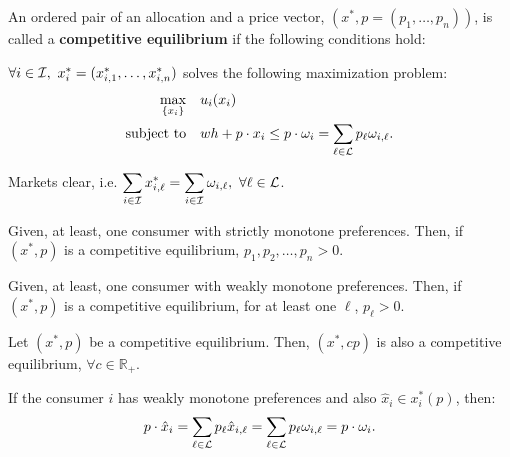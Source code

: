 \documentclass[8pt,a4paper]{extarticle}
\begin{document}
\begin{multicols}{3}
  \begin{boxdef}
    An ordered pair of an allocation and a price vector, $(x^*, p = (p_1, \ldots, p_n))$, is called a \textbf{competitive equilibrium} if the following conditions hold:
    \begin{eqlist}
      \item $\forall i \in \mathcal{I},\ x^*_i = (x^*_{i, 1}, \ldots, x^*_{i, n})$ solves the following maximization problem:
      \begin{equation*}
        \begin{aligned}
          \max_{\{x_i\}}\quad                 & u_i(x_i)                                                                             \\
          \text{\normalfont subject to} \quad & wh + p \cdot x_i \le p \cdot \omega_i = \sum_{\ell \in \mathcal{L}} p_\ell \omega_{i, \ell}.
        \end{aligned}
      \end{equation*}
      \item Markets clear, i.e. $\displaystyle \sum_{i \in \mathcal{I}} x^*_{i, \ell} = \sum_{i \in \mathcal{I}} \omega_{i, \ell},\ \forall \ell \in \mathcal{L}$.
    \end{eqlist}
  \end{boxdef}

  \newpage

  \begin{boxprop}
    Given, at least, one consumer with strictly monotone preferences. Then, if $(x^*, p)$ is a competitive equilibrium, $p_1, p_2, \ldots, p_n > 0$.
  \end{boxprop}

  \begin{boxprop}
    Given, at least, one consumer with weakly monotone preferences. Then, if $(x^*, p)$ is a competitive equilibrium, for at least one $\ell$, $p_\ell > 0$.
  \end{boxprop}

  \begin{boxprop}
    Let $(x^*, p)$ be a competitive equilibrium. Then, $(x^*, cp)$ is also a competitive equilibrium, $\forall c \in \mathbb{R}_+$.
  \end{boxprop}

  \begin{boxtheo}
    If the consumer $i$ has weakly monotone preferences and also $\hat{x}_i \in x^*_i (p)$, then:
    \[
      p \cdot \hat{x}_i = \sum_{\ell \in \mathcal{L}} p_\ell \hat{x}_{i, \ell} = \sum_{\ell \in \mathcal{L}} p_\ell \omega_{i, \ell} = p \cdot \omega_i
      .\]
  \end{boxtheo}


\end{multicols}
\end{document}
